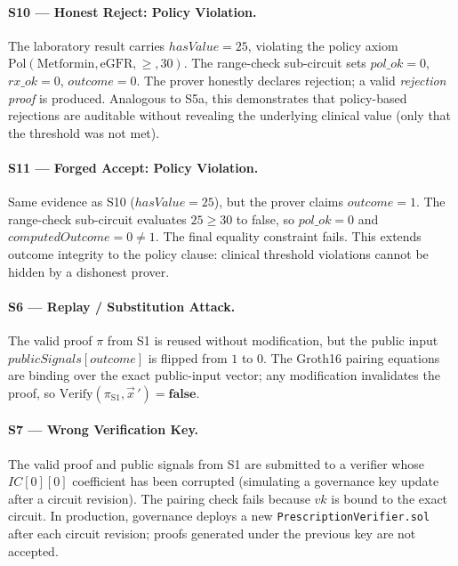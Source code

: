 \documentclass[journal]{IEEEtran}
\begin{document}
\paragraph{S10 --- Honest Reject: Policy Violation.}
The laboratory result carries $\mathit{hasValue} = 25$, violating
the policy axiom
$\mathrm{Pol}(\mathrm{Metformin}, \mathrm{eGFR}, {\geq}, 30)$. The
range-check sub-circuit sets $\mathit{pol\_ok} = 0$,
$\mathit{rx\_ok} = 0$, $\mathit{outcome} = 0$. The prover honestly
declares rejection; a valid \emph{rejection proof} is produced.
Analogous to S5a, this demonstrates that policy-based rejections are
auditable without revealing the underlying clinical value (only that
the threshold was not met).

\paragraph{S11 --- Forged Accept: Policy Violation.}
Same evidence as S10 ($\mathit{hasValue} = 25$), but the prover
claims $\mathit{outcome} = 1$. The range-check sub-circuit evaluates
$25 \geq 30$ to false, so $\mathit{pol\_ok} = 0$ and
$\mathit{computedOutcome} = 0 \neq 1$. The final equality constraint
fails. This extends outcome integrity to the policy clause: clinical
threshold violations cannot be hidden by a dishonest prover.

\paragraph{S6 --- Replay / Substitution Attack.}
The valid proof $\pi$ from S1 is reused without modification, but
the public input $\mathit{publicSignals}[\mathit{outcome}]$ is
flipped from $1$ to $0$. The Groth16 pairing equations are binding
over the exact public-input vector; any modification invalidates the
proof, so
$\mathrm{Verify}(\pi_{\mathrm{S1}}, \vec{x}\,{}') = \mathbf{false}$.

\paragraph{S7 --- Wrong Verification Key.}
The valid proof and public signals from S1 are submitted to a
verifier whose $\mathit{IC}[0][0]$ coefficient has been corrupted
(simulating a governance key update after a circuit revision). The
pairing check fails because $\mathit{vk}$ is bound to the exact
circuit. In production, governance deploys a new
\texttt{PrescriptionVerifier.sol} after each circuit revision;
proofs generated under the previous key are not accepted.
\end{document}
